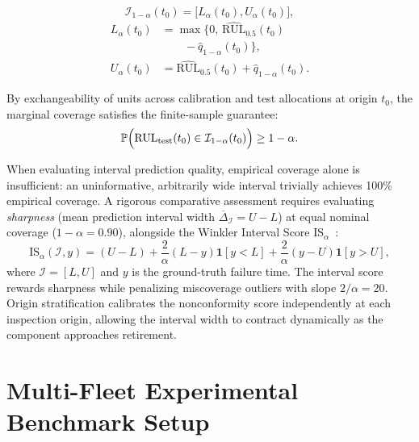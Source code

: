 \documentclass[a4paper,fleqn]{cas-dc}
\newcommand{\RUL}{\mathrm{RUL}}
\begin{document}
\begin{equation}
\label{eq:conformal_interval}
\mathcal{I}_{1-\alpha}(t_0)
=\bigl[L_\alpha(t_0),U_\alpha(t_0)\bigr],
\end{equation}
\begin{equation}
\begin{aligned}
L_\alpha(t_0)
&=\max\bigl\{0,\,
\widehat{\RUL}_{0.5}(t_0)\\
&\qquad-\hat{q}_{1-\alpha}(t_0)\bigr\},\\
U_\alpha(t_0)
&=\widehat{\RUL}_{0.5}(t_0)
+\hat{q}_{1-\alpha}(t_0).
\end{aligned}
\end{equation}


By exchangeability of units across calibration and test allocations at origin $t_0$, the marginal coverage satisfies the finite-sample guarantee:
\begin{equation}
    \mathbb{P}\Bigl(\RUL_{\mathrm{test}}(t_0) \in \mathcal{I}_{1-\alpha}(t_0)\Bigr) \ge 1 - \alpha.
    \label{eq:coverage_guarantee}
\end{equation}

When evaluating interval prediction quality, empirical coverage alone is insufficient: an uninformative, arbitrarily wide interval trivially achieves 100\% empirical coverage. A rigorous comparative assessment requires evaluating \emph{sharpness} (mean prediction interval width $\overline{\Delta}_{\mathcal{I}} = U - L$) at equal nominal coverage ($1 - \alpha = 0.90$), alongside the Winkler Interval Score $\mathrm{IS}_\alpha$~\cite{Zhang_CP_2025}:
\begin{equation}
    \mathrm{IS}_\alpha(\mathcal{I}, y) = (U - L) + \frac{2}{\alpha}(L - y)\mathbf{1}[y < L] + \frac{2}{\alpha}(y - U)\mathbf{1}[y > U],
    \label{eq:interval_score}
\end{equation}
where $\mathcal{I} = [L, U]$ and $y$ is the ground-truth failure time. The interval score rewards sharpness while penalizing miscoverage outliers with slope $2/\alpha = 20$. Origin stratification calibrates the nonconformity score independently at each inspection origin, allowing the interval width to contract dynamically as the component approaches retirement.

\section{Multi-Fleet Experimental Benchmark Setup}
\label{sec:experiments}
\end{document}
